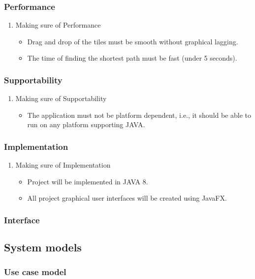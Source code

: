 \documentclass[a4paper,10pt]{article}
\begin{document}
\subsubsection{Performance}
\begin{enumerate}
\item Making sure of Performance
\begin{itemize}
\item Drag and drop of the tiles must be smooth without graphical lagging. 
\item The time of finding the shortest path must be fast (under 5 seconds).
\end{itemize}
\end{enumerate}

\subsubsection{Supportability}
\begin{enumerate}
\item Making sure of Supportability
\begin{itemize}
\item The application must not be platform dependent, i.e., it should be able to run on any platform supporting JAVA.
\end{itemize}
\end{enumerate}

\subsubsection{Implementation}
\begin{enumerate}
\item Making sure of Implementation
\begin{itemize}
\item Project will be implemented in JAVA 8.
\item All project graphical user interfaces will be created using JavaFX.
\end{itemize}
\end{enumerate}
\subsubsection{Interface}


\subsection{System models}
\subsubsection{Use case model}
\end{document}
